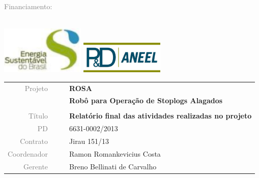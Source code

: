 \textcolor{gray}{Financiamento: } \\ 
\\
\begin{minipage}{\textwidth}
	\centering
	
	\includegraphics[width=0.3\textwidth]{logo/esbr-logo}
	\includegraphics[width=0.3\textwidth]{logo/aneel-logo}

	
\end{minipage}

\vspace{4cm}

\begin{table}[ht!]
	\centering
	\begin{tabular}{r l|l p{12cm} }
		\textcolor{gray}{Projeto} &&& \textbf{\Large ROSA}\\
			&&& \textbf{Robô para Operação de Stoplogs Alagados}\\
			&&& \\
		\textcolor{gray}{Título} &&& \textbf{Relatório final das atividades
		realizadas no projeto}\\
		\textcolor{gray}{PD} &&& 6631-0002/2013 \\
		\textcolor{gray}{Contrato} &&& Jirau 151/13\\
		\textcolor{gray}{Coordenador} &&& Ramon Romankevicius Costa \\
		\textcolor{gray}{Gerente} &&& Breno Bellinati de Carvalho \\
	\end{tabular}
\end{table}


\cleardoublepage


